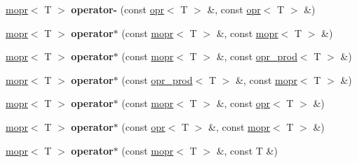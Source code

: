 \begin{DoxyCompactItemize}
\item 
\mbox{\label{classqbasis_1_1mopr_a98e24e8079aac7ba632c55286563b2df}} 
\hyperlink{classqbasis_1_1mopr}{mopr}$<$ T $>$ {\bfseries operator-\/} (const \hyperlink{classqbasis_1_1opr}{opr}$<$ T $>$ \&, const \hyperlink{classqbasis_1_1opr}{opr}$<$ T $>$ \&)
\item 
\mbox{\label{classqbasis_1_1mopr_a4ecfc82495b666b22c57b845d2ac9347}} 
\hyperlink{classqbasis_1_1mopr}{mopr}$<$ T $>$ {\bfseries operator$\ast$} (const \hyperlink{classqbasis_1_1mopr}{mopr}$<$ T $>$ \&, const \hyperlink{classqbasis_1_1mopr}{mopr}$<$ T $>$ \&)
\item 
\mbox{\label{classqbasis_1_1mopr_adf1dd9a8d0187ef60c1092d10d8a08e1}} 
\hyperlink{classqbasis_1_1mopr}{mopr}$<$ T $>$ {\bfseries operator$\ast$} (const \hyperlink{classqbasis_1_1mopr}{mopr}$<$ T $>$ \&, const \hyperlink{classqbasis_1_1opr__prod}{opr\+\_\+prod}$<$ T $>$ \&)
\item 
\mbox{\label{classqbasis_1_1mopr_a797f4a2769511fc49abe5319a184f0bf}} 
\hyperlink{classqbasis_1_1mopr}{mopr}$<$ T $>$ {\bfseries operator$\ast$} (const \hyperlink{classqbasis_1_1opr__prod}{opr\+\_\+prod}$<$ T $>$ \&, const \hyperlink{classqbasis_1_1mopr}{mopr}$<$ T $>$ \&)
\item 
\mbox{\label{classqbasis_1_1mopr_ae76c7c0327f8c01b06cd394b11301d5d}} 
\hyperlink{classqbasis_1_1mopr}{mopr}$<$ T $>$ {\bfseries operator$\ast$} (const \hyperlink{classqbasis_1_1mopr}{mopr}$<$ T $>$ \&, const \hyperlink{classqbasis_1_1opr}{opr}$<$ T $>$ \&)
\item 
\mbox{\label{classqbasis_1_1mopr_a45e45f8275f4140bd519caa435080845}} 
\hyperlink{classqbasis_1_1mopr}{mopr}$<$ T $>$ {\bfseries operator$\ast$} (const \hyperlink{classqbasis_1_1opr}{opr}$<$ T $>$ \&, const \hyperlink{classqbasis_1_1mopr}{mopr}$<$ T $>$ \&)
\item 
\mbox{\label{classqbasis_1_1mopr_a9f02528c87ca62ba1e9e7e49adc997d9}} 
\hyperlink{classqbasis_1_1mopr}{mopr}$<$ T $>$ {\bfseries operator$\ast$} (const \hyperlink{classqbasis_1_1mopr}{mopr}$<$ T $>$ \&, const T \&)
\item 

\end{DoxyCompactItemize}
